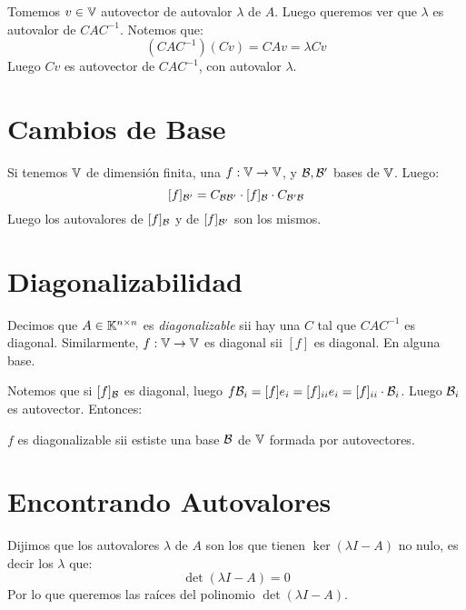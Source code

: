 \documentclass{article}
\begin{document}
Tomemos $v \in \mathbb{V}$ autovector de autovalor $\lambda$ de $A$. Luego queremos ver que $\lambda$ es autovalor de $CAC^{-1}$. Notemos que:
\[
    (CAC^{-1})(Cv) = CAv = \lambda Cv
\]
Luego $Cv$ es autovector de $CAC^{-1}$, con autovalor $\lambda$.

\section*{Cambios de Base}
Si tenemos $\mathbb{V}$ de dimensión finita, una $f : \mathbb{V} \to \mathbb{V}$, y $\mathcal{B}, \mathcal{B}'$ bases de $\mathbb{V}$. Luego:
\[
    [f]_{\mathcal{B}'} = C_{\mathcal{B}\mathcal{B}'} \cdot [f]_{\mathcal{B}} \cdot C_{\mathcal{B}'\mathcal{B}}
\]
Luego los autovalores de $[f]_{\mathcal{B}}$ y de $[f]_{\mathcal{B}'}$ son los mismos.

\section*{Diagonalizabilidad}
Decimos que $A \in \mathbb{K}^{n \times n}$ es \emph{diagonalizable} sii hay una $C$ tal que $CAC^{-1}$ es diagonal. Similarmente, $f : \mathbb{V} \to \mathbb{V}$ es diagonal sii $[f]$ es diagonal. En alguna base.

Notemos que si $[f]_{\mathcal{B}}$ es diagonal, luego $f \mathcal{B}_i = [f] e_i = [f]_{ii}e_i = [f]_{ii} \cdot \mathcal{B}_i$. Luego $\mathcal{B}_i$ es autovector. Entonces:

$f$ es diagonalizable sii estiste una base $\mathcal{B}$ de $\mathbb{V}$ formada por autovectores.

\section*{Encontrando Autovalores}
Dijimos que los autovalores $\lambda$ de $A$ son los que tienen $\ker (\lambda I - A)$ no nulo, es decir los $\lambda$ que:
\[
    \det (\lambda I - A) = 0
\]
Por lo que queremos las raíces del polinomio $\det (\lambda I - A)$.
\end{document}
